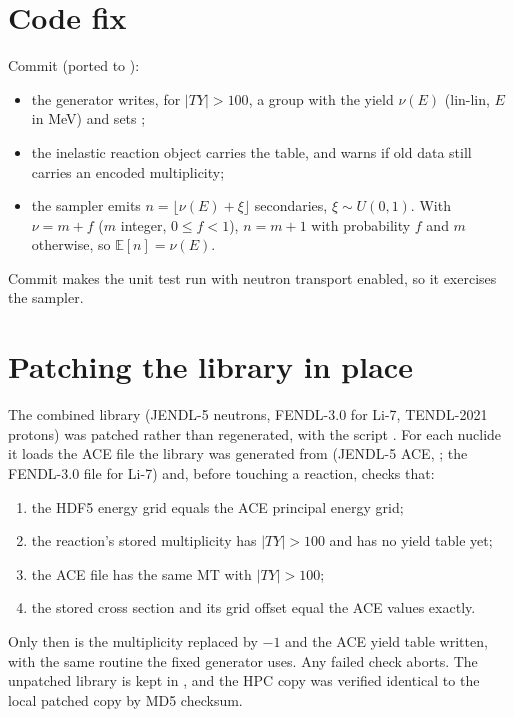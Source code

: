 \section{Code fix}
Commit  (ported to ):
\begin{itemize}
  \item the generator writes, for $|TY|>100$, a group  with the yield $\nu(E)$ (lin-lin, $E$ in MeV) and sets ;
  \item the inelastic reaction object carries the table, and warns if old data still carries an encoded multiplicity;
  \item the sampler emits $n=\lfloor \nu(E) + \xi\rfloor$ secondaries, $\xi\sim U(0,1)$. With $\nu = m + f$ ($m$ integer, $0\le f<1$), $n=m+1$ with probability $f$ and $m$ otherwise, so $\mathbb{E}[n]=\nu(E)$.
\end{itemize}
Commit  makes the unit test  run with neutron transport enabled, so it exercises the sampler.

\section{Patching the library in place}
The combined library  (JENDL-5 neutrons, FENDL-3.0 \citep{forrest2012fendl3} for Li-7, TENDL-2021 \citep{koning2019tendl} protons) was patched rather than regenerated, with the script . For each nuclide it loads the ACE file the library was generated from (JENDL-5 ACE,  \citep{jendl5ace}; the FENDL-3.0 file for Li-7) and, before touching a reaction, checks that:
\begin{enumerate}
  \item the HDF5 energy grid equals the ACE principal energy grid;
  \item the reaction's stored multiplicity has $|TY|>100$ and has no yield table yet;
  \item the ACE file has the same MT with $|TY|>100$;
  \item the stored cross section and its grid offset equal the ACE values exactly.
\end{enumerate}
Only then is the multiplicity replaced by $-1$ and the ACE yield table written, with the same routine the fixed generator uses. Any failed check aborts. The unpatched library is kept in , and the HPC copy was verified identical to the local patched copy by MD5 checksum.

